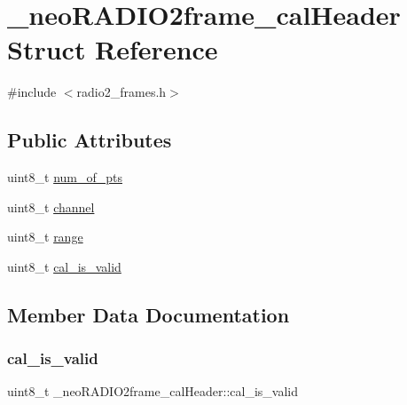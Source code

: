 \hypertarget{struct__neo_r_a_d_i_o2frame__cal_header}{}\section{\+\_\+neo\+R\+A\+D\+I\+O2frame\+\_\+cal\+Header Struct Reference}
\label{struct__neo_r_a_d_i_o2frame__cal_header}


{\ttfamily \#include $<$radio2\+\_\+frames.\+h$>$}

\subsection*{Public Attributes}
\begin{DoxyCompactItemize}
\item 
uint8\+\_\+t \mbox{\hyperlink{struct__neo_r_a_d_i_o2frame__cal_header_a9482641614b323c5ad7daf58ab37d258}{num\+\_\+of\+\_\+pts}}
\item 
uint8\+\_\+t \mbox{\hyperlink{struct__neo_r_a_d_i_o2frame__cal_header_a4e283327baacedc3901f17c99b76da9d}{channel}}
\item 
uint8\+\_\+t \mbox{\hyperlink{struct__neo_r_a_d_i_o2frame__cal_header_ab2395336d3e2b17dc30c4f17e4c1db37}{range}}
\item 
uint8\+\_\+t \mbox{\hyperlink{struct__neo_r_a_d_i_o2frame__cal_header_aba8678a55bff84fdb9b2939d0bd33f6b}{cal\+\_\+is\+\_\+valid}}
\end{DoxyCompactItemize}


\subsection{Member Data Documentation}
\mbox{\label{struct__neo_r_a_d_i_o2frame__cal_header_aba8678a55bff84fdb9b2939d0bd33f6b}} 
\subsubsection{\texorpdfstring{cal\+\_\+is\+\_\+valid}{cal\_is\_valid}}
{\footnotesize\ttfamily uint8\+\_\+t \+\_\+neo\+R\+A\+D\+I\+O2frame\+\_\+cal\+Header\+::cal\+\_\+is\+\_\+valid}

